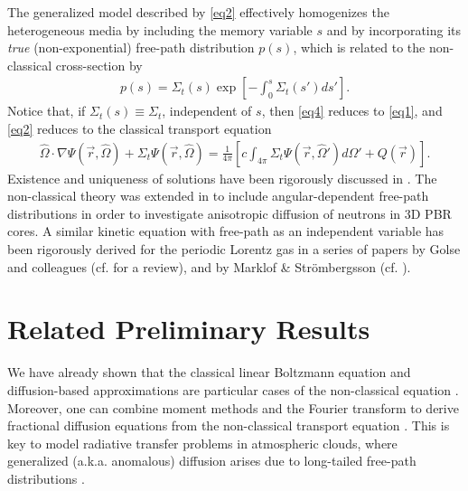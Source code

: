 \documentclass[12pt]{article}
\newcommand{\rvec}{\ensuremath{\vec{r}}}
\newcommand{\omvec}{\ensuremath{\hat{\Omega}}}
\begin{document}
The generalized model described by \cref{eq2} effectively homogenizes the heterogeneous media by including the memory variable $s$ and by incorporating its \textit{true} (non-exponential) free-path distribution $p(s)$, which is related to the non-classical cross-section by \cite{larvas11}
\begin{align}\label{eq4}
p(s) = \Sigma_t(s)\exp\left[-\int_0^s\Sigma_t(s')ds'\right].
\end{align}
Notice that, if $\Sigma_t(s)\equiv\Sigma_t$, independent of $s$, then \cref{eq4} reduces to \cref{eq1}, and \cref{eq2} reduces to the classical transport equation
\begin{align}\label{eq5}
\omvec\cdot\nabla\Psi(\rvec,\omvec) + \Sigma_t\Psi(\rvec,\omvec)
= \frac{1}{4\pi}\left[c\int_{4\pi} \Sigma_t\Psi(\rvec,\omvec')d\Omega' + Q(\rvec)\right].\nonumber
\end{align}
Existence and uniqueness of solutions have been rigorously discussed in \cite{fragou10}.
The non-classical theory was extended in \cite{vaslar14a} to include angular-dependent free-path distributions in order to investigate anisotropic diffusion of neutrons in 3D PBR cores.
A similar kinetic equation with free-path as an independent variable has been rigorously derived for the periodic Lorentz gas in a series of papers by Golse and colleagues (cf. \cite{gol12} for a review), and by Marklof \& Str\"ombergsson (cf. \cite{marstr11,marstr15}).

\section{Related Preliminary Results}

We have already shown that the classical linear Boltzmann equation and diffusion-based approximations are particular cases of the non-classical equation \cite{frakry15,vas16}.
Moreover, one can combine moment methods and the Fourier transform to derive fractional diffusion equations from the non-classical transport equation \cite{frasun16}.
This is key to model radiative transfer problems in atmospheric clouds, where generalized (a.k.a. anomalous) diffusion arises due to long-tailed free-path distributions \cite{davmar97,schetal06}.
\end{document}
